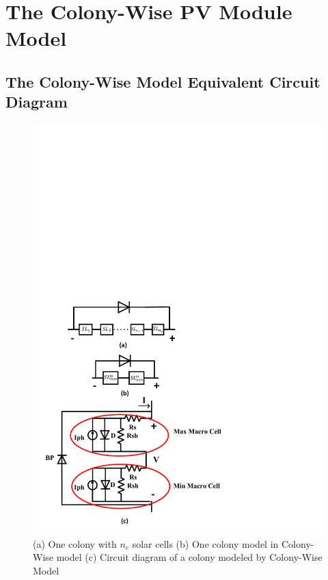 \section{The Colony-Wise PV Module Model}
\subsection{The Colony-Wise Model Equivalent Circuit Diagram}
\begin{figure}[tb]
    \centering
    \includegraphics[width=1\columnwidth]{figs/cw_model_diagram.pdf}
    \caption{(a) One colony with $n_c$ solar cells (b) One colony model in Colony-Wise model (c) Circuit diagram of a colony modeled by Colony-Wise Model}
    \label{fig:cwDiagram}
\end{figure}

